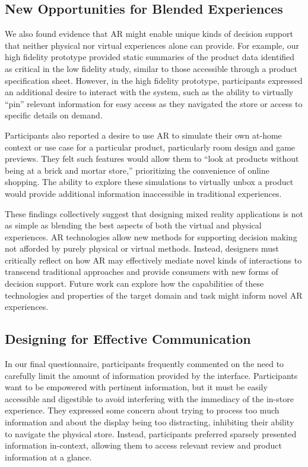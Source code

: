 \subsection{New Opportunities for Blended Experiences}
We also found evidence that AR might enable unique kinds of decision support that neither physical nor virtual experiences alone can provide. For example, our high fidelity prototype provided static summaries of the product data identified as critical in the low fidelity study, similar to those accessible through a product specification sheet. However, in the high fidelity prototype, participants expressed an additional desire to interact with the system, such as the ability to virtually ``pin'' relevant information for easy access as they navigated the store or access to specific details on demand. 

Participants also reported a desire to use AR to simulate their own at-home context or use case for a particular product, particularly room design and game previews. They felt such features would allow them to ``look at products without being at a brick and mortar store,'' prioritizing the convenience of online shopping. The ability to explore these simulations to virtually unbox a product would provide additional information inaccessible in traditional experiences.

These findings collectively suggest that designing mixed reality applications is not as simple as blending the best aspects of both the virtual and physical experiences. AR technologies allow new methods for supporting decision making not afforded by purely physical or virtual methods. Instead, designers must critically reflect on how AR may effectively mediate novel kinds of interactions to transcend traditional approaches and provide consumers with new forms of decision support. Future work can explore how the capabilities of these technologies and properties of the target domain and task might inform novel AR experiences.

\subsection{Designing for Effective Communication}
In our final questionnaire, participants frequently commented on the need to carefully limit the amount of information provided by the interface. Participants want to be empowered with pertinent information, but it must be easily accessible and digestible to avoid interfering with the immediacy of the in-store experience. They expressed some concern about trying to process too much information and about the display being too distracting, inhibiting their ability to navigate the physical store. Instead, participants preferred sparsely presented information in-context, allowing them to access relevant review and product information at a glance. 


